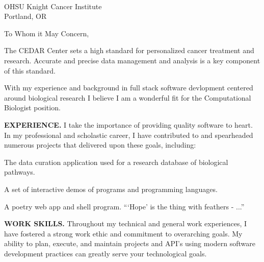



\textcolor{my-grey}{\dotfill}
\bigbreak

{\DTMtoday}\\
OHSU Knight Cancer Institute\\
Portland, OR

\vspace*{2\baselineskip}

To Whom it May Concern,

\vspace*{\baselineskip}

The CEDAR Center sets a high standard for personalized cancer treatment and research. Accurate and precise data management and analysis is a key component of this standard.

\vspace*{\baselineskip}

With my experience and background in full stack software devlopment centered around biological research I believe I am a wonderful fit for the Computational Biologist position.

\vspace*{\baselineskip}

\textbf{EXPERIENCE.} I take the importance of providing quality software to heart. In my professional and scholastic career, I have contributed to and spearheaded numerous projects that delivered upon these goals, including:

\begin{itemize}[label=$\triangleright$]
The data curation application used for a research database of biological pathways.

A set of interactive demos of programs and programming languages.

A poetry web app and shell program. ```Hope' is the thing with feathers - ...''

\end{itemize}

\vspace*{\baselineskip}

\textbf{WORK SKILLS.} Throughout my technical and general work experiences, I have fostered a strong work ethic and commitment to overarching goals. My ability to plan, execute, and maintain projects and API's using modern software development practices can greatly serve your technological goals.

